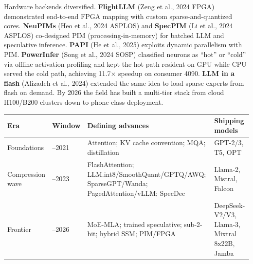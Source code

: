 Hardware backends diversified. \textbf{FlightLLM} (Zeng et al., 2024 FPGA) demonstrated end-to-end FPGA mapping with custom sparse-and-quantized cores. \textbf{NeuPIMs} (Heo et al., 2024 ASPLOS) and \textbf{SpecPIM} (Li et al., 2024 ASPLOS) co-designed PIM (processing-in-memory) for batched LLM and speculative inference. \textbf{PAPI} (He et al., 2025) exploits dynamic parallelism with PIM. \textbf{PowerInfer} (Song et al., 2024 SOSP) classified neurons as ``hot'' or ``cold'' via offline activation profiling and kept the hot path resident on GPU while CPU served the cold path, achieving 11.7× speedup on consumer 4090. \textbf{LLM in a flash} (Alizadeh et al., 2024) extended the same idea to load sparse experts from flash on demand. By 2026 the field has built a multi-tier stack from cloud H100/B200 clusters down to phone-class deployment.

{\def\LTcaptype{none} %
\begin{longtable}[]{@{}
  >{\raggedright\arraybackslash}p{}
  >{\raggedright\arraybackslash}p{}
  >{\raggedright\arraybackslash}p{}
  >{\raggedright\arraybackslash}p{}@{}}
\toprule\noalign{}
\begin{minipage}[b]{\linewidth}\raggedright
Era
\end{minipage} & \begin{minipage}[b]{\linewidth}\raggedright
Window
\end{minipage} & \begin{minipage}[b]{\linewidth}\raggedright
Defining advances
\end{minipage} & \begin{minipage}[b]{\linewidth}\raggedright
Shipping models
\end{minipage} \\
\midrule\noalign{}
\endhead
\bottomrule\noalign{}
\endlastfoot
Foundations & 2017--2021 & Attention; KV cache convention; MQA; distillation & GPT-2/3, T5, OPT \\
Compression wave & 2022--2023 & FlashAttention; LLM.int8/SmoothQuant/GPTQ/AWQ; SparseGPT/Wanda; PagedAttention/vLLM; SpecDec & Llama-2, Mistral, Falcon \\
Frontier & 2024--2026 & MoE-MLA; trained speculative; sub-2-bit; hybrid SSM; PIM/FPGA & DeepSeek-V2/V3, Llama-3, Mixtral 8x22B, Jamba \\
\end{longtable}
}

